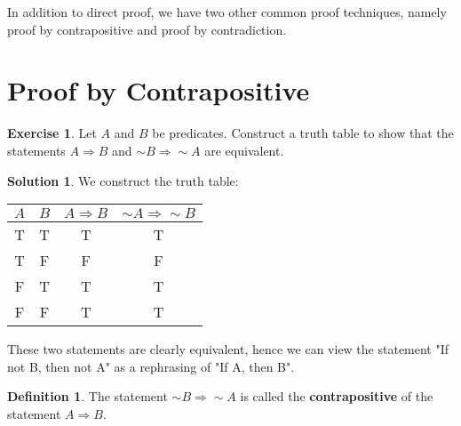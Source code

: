 \documentclass[a4paper, 11pt]{report}
\theoremstyle{plain}
\theoremstyle{definition}
\newtheorem{defn}[thm]{Definition}
\newtheorem{exrc}[thm]{Exercise}
\newtheorem*{sltn}{Solution}
\newcommand{\impl}{\Longrightarrow}
\renewcommand{\neg}{{\sim}} %
\begin{document}
In addition to direct proof, we have two other common proof techniques, namely
proof by contrapositive and proof by contradiction.

\pagebreak
\section{Proof by Contrapositive}
\label{sec:proof_by_contrapositive}
\begin{exrc}
  Let $A$ and $B$ be predicates. Construct a truth table to show that the
  statements $A \impl B$ and $\neg B \impl \neg A$ are equivalent.
\end{exrc}
\begin{sltn}
  We construct the truth table:
  \begin{table}[h!]
    \begin{tabular}{cccc}
      \hline
      $A$ & $B$ & $A \impl B$ & $\neg A \impl \neg B$\\
      \hline
      T& T& T& T\\
      T& F& F& F\\
      F& T& T& T\\
      F& F& T& T\\
      \hline
    \end{tabular}
  \end{table}
\end{sltn}

These two statements are clearly equivalent, hence we can view the statement
"If not B, then not A" as a rephrasing of "If A, then B".
\begin{defn}
  The statement $\neg B \impl \neg A$ is called the
  \textbf{contrapositive} of the statement $A \impl B$.
\end{defn}
\end{document}
